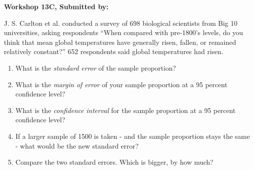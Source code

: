 \documentclass[11pt]{book}\usepackage[]{graphicx}\usepackage[]{color}
\begin{document}
\begin{exercises}
\begin{solution}

\end{solution}

\clearpage

    \begin{exercise}  %


    \begin{center}
\begin{flushleft}\textbf{\large \hfill Workshop 13C, Submitted by: }\end{flushleft}

\end{center}   %

J. S. Carlton et al. conducted a survey of 698 biological scientists from Big 10 universities, asking respondents “When compared with pre-1800’s levels, do you think that mean global temperatures have generally risen, fallen, or remained relatively constant?” 652 respondents said global temperatures had risen.

\begin{enumerate}
\item What is the \textit{standard error} of the sample proportion?
\item What is the \textit{margin of error} of your sample proportion at a 95 percent confidence level?
\item What is the \textit{confidence interval} for the sample proportion at a 95 percent confidence level?
\item If a larger sample of 1500 is taken - and the sample proportion stays the same - what would be the new standard error?
\item Compare the two standard errors. Which is bigger, by how much?
\end{enumerate}


\end{exercise}
\end{exercises}
\end{document}
